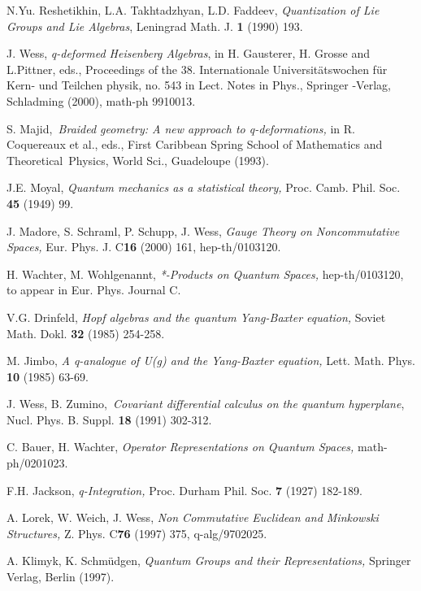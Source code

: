 \documentclass[a4paper,11pt,oneside]{article}
\begin{document}
\begin{thebibliography}{99}
  N.Yu. Reshetikhin, L.A. Takhtadzhyan, L.D. Faddeev, \textit{%
Quantization of Lie Groups and Lie Algebras}, Leningrad Math. J. \textbf{1}
(1990) 193.

  J. Wess, \textit{q-deformed Heisenberg Algebras}, in H.
Gausterer, H. Grosse and L.Pittner, eds., Proceedings of the 38.
Internationale Universit\"{a}tswochen f\"{u}r Kern- und Teilchen physik, no.
543 in Lect. Notes in Phys., Springer -Verlag, Schladming (2000), math-ph
9910013.

  S. Majid,\textit{\ Braided geometry: A new approach to
q-deformations, }in R. Coquereaux et al., eds., First Caribbean Spring
School of Mathematics and Theoretical\ Physics, World Sci., Guadeloupe
(1993).

  J.E. Moyal, \textit{Quantum mechanics as a statistical
theory, }Proc. Camb. Phil. Soc. \textbf{45} (1949) 99.

  J. Madore, S. Schraml, P. Schupp, J. Wess, \textit{Gauge
Theory on Noncommutative Spaces, }Eur. Phys. J. C\textbf{16} (2000) 161,
hep-th/0103120.

  H. Wachter, M. Wohlgenannt, \textit{*-Products on Quantum
Spaces, }hep-th/0103120, to appear in Eur. Phys. Journal C.

  V.G. Drinfeld, \textit{Hopf algebras and the quantum
Yang-Baxter equation, }Soviet Math. Dokl. \textbf{32} (1985)  254-258.

  M. Jimbo, \textit{A q-analogue of U(g) and the Yang-Baxter
equation,} Lett. Math. Phys. \textbf{10} (1985) 63-69.

  J. Wess, B. Zumino,\textit{\ Covariant differential calculus
on the quantum hyperplane}, Nucl. Phys. B. Suppl. \textbf{18} (1991)
302-312.

  C. Bauer, H. Wachter, \textit{Operator Representations on
Quantum Spaces, }math-ph/0201023.

  F.H. Jackson, \textit{q-Integration,} Proc. Durham Phil.
Soc. \textbf{7} (1927)  182-189.


  A. Lorek, W. Weich, J. Wess, \textit{Non Commutative
Euclidean and Minkowski Structures, }Z. Phys. C\textbf{76} (1997) 375,
q-alg/9702025.

  A. Klimyk, K. Schm\"{u}dgen, \textit{Quantum Groups and
their Representations,} Springer Verlag, Berlin (1997).


\end{thebibliography}
\end{document}
